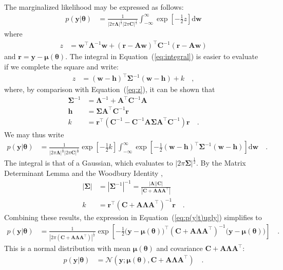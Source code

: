 \documentclass[modern]{rnaastex}
\renewcommand{\eqref}[1]{\ref{eq:#1}}
\newcommand{\Eq}[1]{Equation~(\eqref{#1})}
\newcommand{\eq}[1]{\Eq{#1}}
\newcommand{\eqlabel}[1]{\label{eq:#1}}
\newcommand{\dd}{\ensuremath{ \mathrm{d}}}
\newcommand{\bvec}[1]{{\ensuremath{\boldsymbol{#1}}}}
\newcommand{\Normal}{\ensuremath{\mathcal{N}}}
\newcommand{\mA}{\ensuremath{\bvec{A}}}
\newcommand{\mC}{\ensuremath{\bvec{C}}}
\newcommand{\mS}{\ensuremath{\bvec{\Sigma}}}
\newcommand{\mL}{\ensuremath{\bvec{\Lambda}}}
\newcommand{\vw}{\ensuremath{\bvec{w}}}
\newcommand{\vy}{\ensuremath{\bvec{y}}}
\newcommand{\vt}{\ensuremath{\bvec{\theta}}}
\newcommand{\vm}{\ensuremath{\bvec{\mu}(\bvec{\theta})}}
\newcommand{\vre}{\ensuremath{\bvec{r}}}
\newcommand{\vh}{\ensuremath{\bvec{h}}}
\begin{document}
The marginalized likelihood may be expressed as follows:
\begin{align}
\eqlabel{integral}
p(\vy | \vt) &= \frac{1}{|2\pi\mL|^\frac{1}{2} |2\pi\mC|^\frac{1}{2}}
                \int_{-\infty}^{\infty} \exp \left[ -\frac{1}{2} z \right] \dd\vw
\end{align}
%
where
%
\begin{align}
\eqlabel{z}
z &= \vw^\top \mL^{-1} \vw + (\vre - \mA \vw)^\top \mC^{-1} (\vre - \mA \vw)
\end{align}
%
and $\vre = \vy - \vm$.
%
The integral in \eq{integral} is easier to evaluate if we
complete the square and write:
%
\begin{align}
\eqlabel{z_square}
z &= (\vw - \vh)^\top \mS^{-1} (\vw - \vh) + k \quad,
\end{align}
%
where, by comparison with \eq{z}, it can be shown that
%
\begin{align}
\mS^{-1} &= \mL^{-1} + \mA^\top \mC^{-1} \mA \\
%
\vh &= \bvec{\Sigma} \mA^\top \mC^{-1} \vre \\
%
k &= \vre^\top \left( \mC^{-1} - \mC^{-1} \mA \mS \mA^\top \mC^{-1} \right) \vre
    \quad.
\end{align}
%
We may thus write
%
\begin{align}
\eqlabel{p(y|t)ugly}
p(\vy | \vt) &= \frac{1}{
                |2\pi\mL|^\frac{1}{2}
                |2\pi\mC|^\frac{1}{2}}
                \exp \left[ -\frac{1}{2}k \right]
                \int_{-\infty}^{\infty} \exp
                \left[-\frac{1}{2}(\vw - \vh)^\top \mS^{-1} (\vw - \vh)
                \right] \dd\vw \quad.
\end{align}
%
The integral is that of a Gaussian, which evaluates to
$|2\pi\bvec{\Sigma}|^\frac{1}{2}$.
By the Matrix Determinant Lemma and the Woodbury Identity
\citep[for example,][]{Woodbury:1950, Harville:1997},
%
\begin{align}
|\mS| &= {|\mS^{-1}|}^{-1} = \frac{|\mL| |\mC|}{|\mC + \mA \mL \mA^\top|} \nonumber \\
k &= \vre^\top \left( \mC + \mA \mL \mA^\top \right)^{-1} \vre \quad.
\end{align}
%
Combining these results, the expression in \eq{p(y|t)ugly} simplifies to
\begin{align}
\eqlabel{p(y|t)exp}
p(\vy | \vt) &= \frac{1}{
                |2\pi(\mC + \mA \mL \mA^\top)|^\frac{1}{2}}
                \exp \left[ -\frac{1}{2} \big( \vy - \vm \big)^\top
                            (\mC + \mA \mL \mA^\top)^{-1}
                            \big( \vy - \vm \big)
                     \right] \quad.
\end{align}
%
This is a normal distribution with mean $\vm$ and covariance
$\mC + \mA \mL \mA^\top$:
%
\begin{align}
\eqlabel{p(y|t)normal_app}
p(\vy | \vt) &= \Normal (\vy; \vm, \mC + \mA \mL \mA^\top) \quad.
\end{align}
\end{document}
